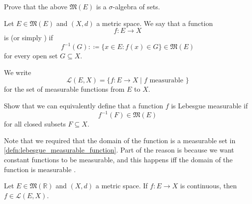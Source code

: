 \documentclass[notoc,notitlepage]{tufte-book}
\begin{document}
\begin{ex}
  Prove that the above $\mathfrak{M}(E)$ is a $\sigma$-algebra of sets.
\end{ex}

\begin{defn}\label{defn:lebesgue_measurable_function}
  Let $E \in \mathfrak{M}(E)$ and $(X, d)$ a metric space. We say that a
  function
  \begin{equation*}
    f : E \to X
  \end{equation*}
  is  (or simply ) if
  \begin{equation*}
    f^{-1}(G) :\coloneqq \{ x \in E : f(x) \in G \} \in \mathfrak{M}(E)
  \end{equation*}
  for every open set $G \subseteq X$.

  We write
  \begin{equation*}
    \mathcal{L}(E, X) = \{ f : E \to X \mid f \text{ measurable } \}
  \end{equation*}
  for the set of measurable functions from $E$ to $X$.
\end{defn}

\begin{ex}
  Show that we can equivalently define that a function $f$ is Lebesgue
  measurable if
  \begin{equation*}
    f^{-1}(F) \in \mathfrak{M}(E)
  \end{equation*}
  for all closed subsets $F \subseteq X$.
\end{ex}

\begin{note}
  Note that we required that the domain of the function is a measurable set in
  \cref{defn:lebesgue_measurable_function}. Part of the reason is because we
  want constant functions to be measurable, and this happens iff the domain of
  the function is measurable .
\end{note}

\begin{propo}\label{propo:continuous_functions_on_a_measurable_set_is_measurable}
  Let $E \in \mathfrak{M}(\mathbb{R})$ and $(X, d)$ a metric space. If $f : E
  \to X$ is continuous, then $f \in \mathcal{L}(E, X)$.
\end{propo}
\end{document}
